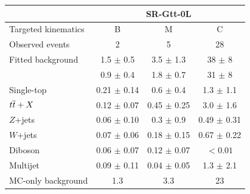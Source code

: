 \begin{table}[htbp]
        \begin{tabular}{lccc}
		\toprule
		& \multicolumn{3}{c}{SR-Gtt-0L} \\
		\midrule	
	       Targeted kinematics & B            &   M         &   C               \\[-0.05cm]
	       \midrule
	       Observed events              &  2 & 5 & 28 \\
	       \midrule
	       Fitted background             & 1.5 $\pm$ 0.5 & 3.5 $\pm$ 1.3 & 38 $\pm$ 8\phantom{0} \\
	       \midrule
	       \ttbar\              & 0.9 $\pm$ 0.4 & 1.8 $\pm$ 0.7 & 31 $\pm$ 8\phantom{0} \\
	       Single-top             & 0.21 $\pm$ 0.14 & 0.6 $\pm$ 0.4 & 1.3 $\pm$ 1.1\\   
	       $t\overline{t}+X$          & 0.12 $\pm$ 0.07 & 0.45 $\pm$ 0.25 & 3.0 $\pm$ 1.6\\
	       $Z$+jets             & 0.06 $\pm$ 0.10 & 0.3 $\pm$ 0.9 & 0.49 $\pm$ 0.31\\
	       $W$+jets            & 0.07 $\pm$ 0.06 & 0.18 $\pm$ 0.15 & 0.67 $\pm$ 0.22\\
	       Diboson             &  0.06 $\pm$ 0.07 & 0.12 $\pm$ 0.07 & $<0.01$\\
 	       Multijet               &  0.09 $\pm$ 0.11 & 0.04 $\pm$ 0.05 & 1.3 $\pm$ 2.1\\
          \midrule
	       MC-only background &   1.3 & 3.3 & 23\\  
	       \bottomrule
	\end{tabular}

	\vspace{0.4cm}
	

\end{table}
